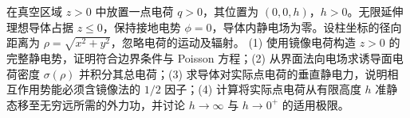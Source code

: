 在真空区域 \(z>0\) 中放置一点电荷 \(q>0\)，其位置为 \((0,0,h)\)，\(h>0\)。无限延伸理想导体占据 \(z\le0\)，保持接地电势 \(\phi=0\)，导体内静电场为零。设柱坐标的径向距离为 \(\rho=\sqrt{x^2+y^2}\)，忽略电荷的运动及辐射。
(1) 使用镜像电荷构造 \(z>0\) 的完整静电势，证明符合边界条件与 Poisson 方程；(2) 从界面法向电场求诱导面电荷密度 \(\sigma(\rho)\) 并积分其总电荷；(3) 求导体对实际点电荷的垂直静电力，说明相互作用势能必须含镜像法的 \(1/2\) 因子；(4) 计算将实际点电荷从有限高度 \(h\) 准静态移至无穷远所需的外力功，并讨论 \(h\to\infty\) 与 \(h\to0^+\) 的适用极限。
